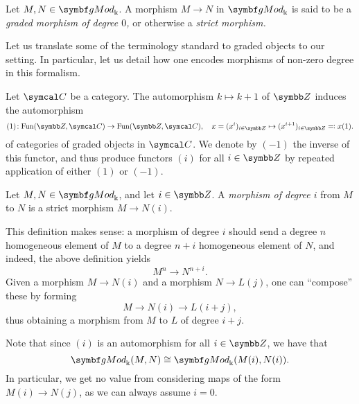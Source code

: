 \begin{terminology}
	Let \(M,N\in\gMod_\Bbbk\). A morphism \(M\to N\) in \(\gMod_\Bbbk\) is said to be a \emph{graded morphism of degree \(0\),}
	or otherwise a \emph{strict morphism.}
\end{terminology}

Let us translate some of the terminology standard to graded objects to our setting. In particular, let us detail how one encodes morphisms
of non-zero degree in this formalism.

\begin{definition}
	Let \(\calC\) be a category. The automorphism \(k\mapsto k+1\) of \(\Z\) induces the automorphism
	\[ (1)\!:\Fun(\Z,\calC)\to\Fun(\Z,\calC),\quad x = (x^i)_{i\in\Z} \mapsto (x^{i+1})_{i\in\Z} \eqcolon x(1). \]
	of categories of graded objects in \(\calC\). We denote by \((-1)\) the inverse of this functor, and thus produce functors
	\((i)\) for all \(i\in\Z\) by repeated application of either \((1)\) or \((-1)\).
\end{definition}
\begin{terminology}
	Let \(M,N\in\gMod_\Bbbk\), and let \(i\in\Z\). A \emph{morphism of degree \(i\)} from \(M\) to \(N\) is a strict morphism
	\(M \to N(i)\).
\end{terminology}
\begin{remark}
	This definition makes sense: a morphism of degree \(i\) should send a degree \(n\) homogeneous element of \(M\) to a degree \(n+i\) homogeneous element
	of \(N\), and indeed, the above definition yields
	\[ M^n \to N^{n+i}. \]
	Given a morphism \(M\to N(i)\) and a morphism \(N\to L(j)\), one can ``compose'' these by forming
	\[ M \to N(i) \to L(i+j), \]
	thus obtaining a morphism from \(M\) to \(L\) of degree \(i+j\).
\end{remark}
\begin{remark}
	Note that since \((i)\) is an automorphism for all \(i\in\Z\), we have that
	\[ \gMod_\Bbbk(M,N) \cong \gMod_{\Bbbk}(M(i),N(i)). \]
	In particular, we get no value from considering maps of the form \(M(i)\to N(j)\), as we can always assume \(i=0\).
\end{remark}

